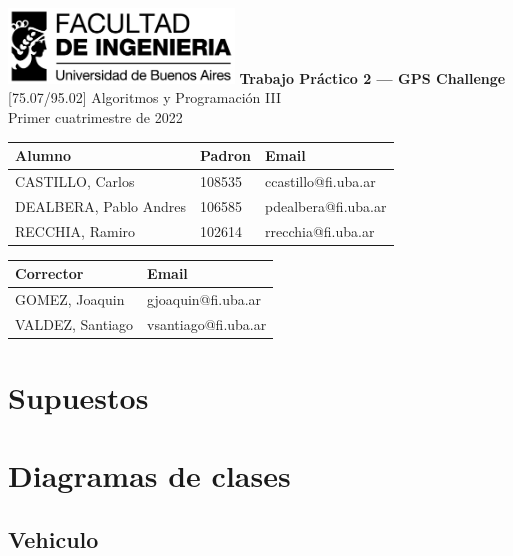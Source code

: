 \documentclass[titlepage,a4paper]{article}
\date{\today}
\title{}
\begin{document}
\begin{titlepage}
    \hfill\includegraphics[width=6cm]{logofiuba.jpg}
    \centering
    \vfill
    \Huge \textbf{Trabajo Práctico 2 — GPS Challenge}
    \vskip2cm
    \Large [75.07/95.02] Algoritmos y Programación III \\
    Primer cuatrimestre de 2022\\
    \vfill
    \begin{tabular}{ | l | l | l | }
      \hline
      Alumno & Padron & Email \\ \hline
      CASTILLO, Carlos & 108535 & ccastillo@fi.uba.ar \\ \hline
      DEALBERA, Pablo Andres & 106585 & pdealbera@fi.uba.ar \\ \hline
      RECCHIA, Ramiro & 102614 & rrecchia@fi.uba.ar \\ \hline
    \end{tabular}
    \vfill
    \begin{tabular}{ | l | l | }
      \hline
      Corrector & Email \\ \hline
      GOMEZ, Joaquin & gjoaquin@fi.uba.ar \\ \hline
      VALDEZ, Santiago & vsantiago@fi.uba.ar \\ \hline
    \end{tabular}
    \vfill
\end{titlepage}
\tableofcontents
\newpage
{}

\section{Supuestos}
\label{sec:orgc3132fc}

\section{Diagramas de clases}
\label{sec:orga1c5731}
\subsection{Vehiculo}
\label{sec:org70eef3c}
\end{document}
